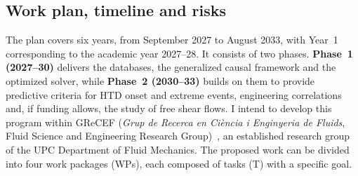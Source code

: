 \documentclass[11pt]{article}
\begin{document}
\newpage
\subsection{Work plan, timeline and risks}\label{sec:workplan}

The plan covers six years, from September 2027 to August 2033, with Year~1 corresponding to the academic year 2027--28. 
It consists of two phases.
\textbf{Phase~1 (2027--30)} delivers the databases, the generalized causal framework and the optimized solver, while \textbf{Phase~2 (2030--33)} builds on them to provide predictive criteria for HTD onset and extreme events, engineering correlations and, if funding allows, the study of free shear flows.
I intend to develop this program within GReCEF (\emph{Grup de Recerca en Ci\`encia i Enginyeria de Fluids}, Fluid Science and Engineering Research Group)~\cite{GReCEF}, an established research group of the UPC Department of Fluid Mechanics. 
The proposed work can be divided into four work packages (WPs), each composed of tasks (T) with a specific goal.
\end{document}
